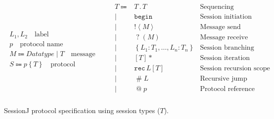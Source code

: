 \documentclass[10pt]{llncs}
\begin{document}
\begin{figure}
\begin{gather*}
\begin{array}{c}
L_1, L_2\quad\mbox{label}
\\[10pt]
p\quad\mbox{protocol name}
\\[10pt]
M \Coloneqq \textit{Datatype} \mid T \quad\mbox{message}
\\[10pt]
S \Coloneqq  p\left\{ T \right\} \quad \mbox{protocol}
\end{array}
\qquad
\begin{array}{rlr}
T \Coloneqq & T\mathbin{.}T & \mbox{Sequencing} \\ 
       \mid & \texttt{begin} & \mbox{Session initiation} \\
       \mid & \mathopen{!}\left<M\right> & \mbox{Message send} \\ 
       \mid & \mathopen{?}\left(M\right) & \mbox{Message receive} \\
       \mid & \left\{L_1 \colon T_1,\dots, L_n \colon T_n \right\} & \mbox{Session branching} \\ %
       \mid & \left[T\right]* & \mbox{Session iteration} \\ 
       \mid & \texttt{rec}\,L\left[T\right] & \mbox{Session recursion scope} \\ 
       \mid & \mathopen{\#}L & \mbox{Recursive jump} \\ 
       \mid & \mathopen{@}p & \mbox{Protocol reference} \\
\end{array}
\end{gather*}
\caption{SessionJ protocol specification using session types ($T$).}\label{tab:prot-spec} 
\end{figure}

\end{document}

